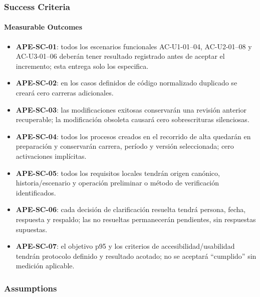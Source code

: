\documentclass[11pt,a4paper]{article}
\providecommand{\tightlist}{\setlength{\itemsep}{0pt}\setlength{\parskip}{0pt}}
\begin{document}
\subsubsection{Success Criteria}\label{success-criteria}

\paragraph{Measurable Outcomes}\label{measurable-outcomes}

\begin{itemize}
\tightlist
\item
  \textbf{APE-SC-01}: todos los escenarios funcionales AC-U1-01--04,
  AC-U2-01--08 y AC-U3-01--06 deberán tener resultado registrado antes
  de aceptar el incremento; esta entrega solo los especifica.
\item
  \textbf{APE-SC-02}: en los casos definidos de código normalizado
  duplicado se creará cero carreras adicionales.
\item
  \textbf{APE-SC-03}: las modificaciones exitosas conservarán una
  revisión anterior recuperable; la modificación obsoleta causará cero
  sobrescrituras silenciosas.
\item
  \textbf{APE-SC-04}: todos los procesos creados en el recorrido de alta
  quedarán en preparación y conservarán carrera, período y versión
  seleccionada; cero activaciones implícitas.
\item
  \textbf{APE-SC-05}: todos los requisitos locales tendrán origen
  canónico, historia/escenario y operación preliminar o método de
  verificación identificados.
\item
  \textbf{APE-SC-06}: cada decisión de clarificación resuelta tendrá
  persona, fecha, respuesta y respaldo; las no resueltas permanecerán
  pendientes, sin respuestas supuestas.
\item
  \textbf{APE-SC-07}: el objetivo p95 y los criterios de
  accesibilidad/usabilidad tendrán protocolo definido y resultado
  acotado; no se aceptará ``cumplido'' sin medición aplicable.
\end{itemize}

\subsubsection{Assumptions}\label{assumptions}
\end{document}
